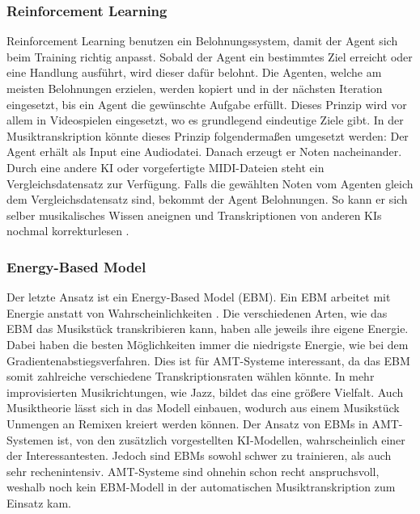 \subsubsection*{Reinforcement Learning}
Reinforcement Learning benutzen ein Belohnungssystem, damit der Agent sich beim Training richtig anpasst.
Sobald der Agent ein bestimmtes Ziel erreicht oder eine Handlung ausführt, wird dieser dafür belohnt.
Die Agenten, welche am meisten Belohnungen erzielen, werden kopiert und in der nächsten Iteration eingesetzt,
bis ein Agent die gewünschte Aufgabe erfüllt.
Dieses Prinzip wird vor allem in Videospielen eingesetzt, wo es grundlegend eindeutige Ziele gibt.
In der Musiktranskription könnte dieses Prinzip folgendermaßen umgesetzt werden:
Der Agent erhält als Input eine Audiodatei.
Danach erzeugt er Noten nacheinander.
Durch eine andere KI oder vorgefertigte MIDI-Dateien steht ein Vergleichsdatensatz zur Verfügung.
Falls die gewählten Noten vom Agenten gleich dem Vergleichsdatensatz sind, bekommt der Agent Belohnungen.
So kann er sich selber musikalisches Wissen aneignen und Transkriptionen von anderen KIs nochmal korrekturlesen \cite{li2018music}.

\subsubsection*{Energy-Based Model}
Der letzte Ansatz ist ein Energy-Based Model (EBM).
Ein EBM arbeitet mit Energie anstatt von Wahrscheinlichkeiten \cite{lecun2006tutorial}.
Die verschiedenen Arten, wie das EBM das Musikstück transkribieren kann, haben alle jeweils ihre eigene Energie.
Dabei haben die besten Möglichkeiten immer die niedrigste Energie, wie bei dem Gradientenabstiegsverfahren.
Dies ist für AMT-Systeme interessant, da das EBM somit zahlreiche verschiedene Transkriptionsraten wählen könnte.
In mehr improvisierten Musikrichtungen, wie Jazz, bildet das eine größere Vielfalt.
Auch Musiktheorie lässt sich in das Modell einbauen,
wodurch aus einem Musikstück Unmengen an Remixen kreiert werden können.
Der Ansatz von EBMs in AMT-Systemen ist,
von den zusätzlich vorgestellten KI-Modellen, wahrscheinlich einer der Interessantesten.
Jedoch sind EBMs sowohl schwer zu trainieren, als auch sehr rechenintensiv.
AMT-Systeme sind ohnehin schon recht anspruchsvoll,
weshalb noch kein EBM-Modell in der automatischen Musiktranskription zum Einsatz kam.

